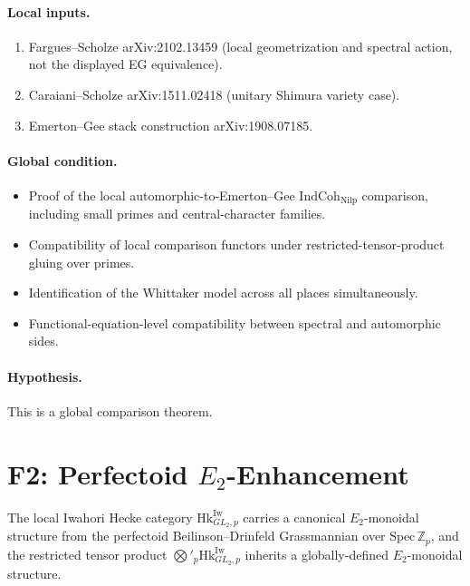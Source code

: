 \paragraph{Local inputs.}
\begin{enumerate}
\item Fargues--Scholze arXiv:2102.13459 (local geometrization and
spectral action, not the displayed EG equivalence).
\item Caraiani--Scholze arXiv:1511.02418 (unitary Shimura variety case).
\item Emerton--Gee stack construction arXiv:1908.07185.
\end{enumerate}

\paragraph{Global condition.}
\begin{itemize}
\item Proof of the local automorphic-to-Emerton--Gee
\(\mathrm{IndCoh}_{\mathrm{Nilp}}\) comparison, including small primes
and central-character families.
\item Compatibility of local comparison functors under
restricted-tensor-product gluing over primes.
\item Identification of the Whittaker model across all places
simultaneously.
\item Functional-equation-level compatibility between spectral and
automorphic sides.
\end{itemize}

\paragraph{Hypothesis.} This is a global comparison theorem.

\section{F2: Perfectoid \(E_{2}\)-Enhancement}
\label{v4-arith:app:C:F2-details}

\begin{conjecture}[restatement of F2]
\label{v4-arith:app:C:F2-restatement}
The local Iwahori Hecke category \(\mathrm{Hk}^{\mathrm{Iw}}_{GL_{2},p}\)
carries a canonical \(E_{2}\)-monoidal structure from the
perfectoid Beilinson--Drinfeld Grassmannian over \(\mathrm{Spec}\,\mathbb{Z}_{p}\),
and the restricted tensor product
\(\bigotimes'_{p}\mathrm{Hk}^{\mathrm{Iw}}_{GL_{2},p}\) inherits a
globally-defined \(E_{2}\)-monoidal structure.
\end{conjecture}

